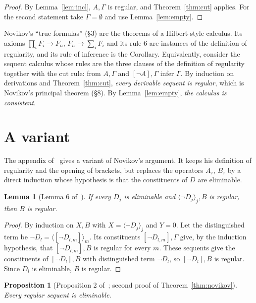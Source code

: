 \documentclass[11pt]{amsart}
\newtheorem{lemma}[theorem]{Lemma}
\newtheorem{proposition}[theorem]{Proposition}
\theoremstyle{definition}
\theoremstyle{remark}
\newcommand{\seq}[1]{\langle #1\rangle}
\newcommand{\one}[1]{[#1]}
\begin{document}
\begin{proof}
  By Lemma~\ref{lem:incl}, $A,\Gamma$ is regular, and Theorem~\ref{thm:cut}
  applies. For the second statement take $\Gamma=\emptyset$ and use
  Lemma~\ref{lem:empty}.
\end{proof}

Novikov's ``true formulas'' (\S3) are the theorems of a Hilbert-style
calculus. Its axioms $\prod_iF_i\to F_n$, $F_n\to\sum_iF_i$ and its rule
6 are instances of the definition of regularity, and its rule of inference
is the Corollary. Equivalently, consider the sequent calculus whose rules
are the three clauses of the definition of regularity together with the cut
rule: from $A,\Gamma$ and $\one{\neg A},\Gamma$ infer $\Gamma$. By
induction on derivations and Theorem~\ref{thm:cut}, \emph{every derivable
sequent is regular}, which is Novikov's principal theorem (\S8). By
Lemma~\ref{lem:empty}, \emph{the calculus is consistent}.

\section{A variant}\label{sec:variant}

The appendix of~\cite{Coquand} gives a variant of Novikov's argument. It
keeps his definition of regularity and the opening of brackets, but
replaces the operators $A_\tau$, $B_\tau$ by a direct induction whose
hypothesis is that the constituents of $D$ are eliminable.

\begin{lemma}[Lemma 6 of~\cite{Coquand}]\label{lem:sum}
  If every $D_j$ is eliminable and $\seq{\neg D_j}_j,B$ is regular, then
  $B$ is regular.
\end{lemma}

\begin{proof}
  By induction on $X,B$ with $X=\seq{\neg D_j}_j$ and $Y=0$. Let the
  distinguished term be $\neg D_l=\seq{\one{\neg D_{l,m}}}_m$. Its
  constituents $\one{\neg D_{l,m}},\Gamma$ give, by the induction
  hypothesis, that $\one{\neg D_{l,m}},B$ is regular for every $m$. These
  sequents give the constituents of $\one{\neg D_l},B$ with
  distinguished term $\neg D_l$, so $\one{\neg D_l},B$ is regular. Since
  $D_l$ is eliminable, $B$ is regular.
\end{proof}

\begin{proposition}[Proposition 2 of~\cite{Coquand}; second proof of Theorem~\ref{thm:novikov}]\label{prop:elim}
  Every regular sequent is eliminable.
\end{proposition}
\end{document}
